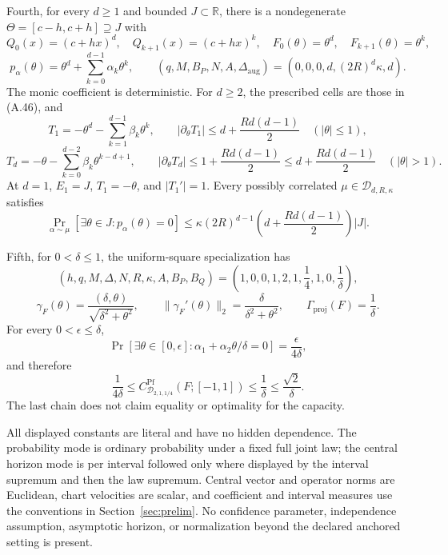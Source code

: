 \begin{proposition}
Fourth, for every $d\geq1$ and bounded $J\subset\mathbb R$, there is a
nondegenerate $\Theta=[c-h,c+h]\supseteq J$ with
\[
Q_0(x)=(c+hx)^d,
\quad Q_{k+1}(x)=(c+hx)^k,
\quad F_0(\theta)=\theta^d,
\quad F_{k+1}(\theta)=\theta^k,
\]
\[
p_\alpha(\theta)=\theta^d+\sum_{k=0}^{d-1}\alpha_k\theta^k,
\qquad
(q,M,B_P,N,A,\Delta_{\mathrm{aug}})
=(0,0,0,d,(2R)^d\kappa,d).
\tag{A.83}
\]
The monic coefficient is deterministic.  For $d\geq2$, the prescribed cells
are those in (A.46), and
\[
T_1=-\theta^d-\sum_{k=1}^{d-1}\beta_k\theta^k,
\qquad
|\partial_\theta T_1|
\leq d+\frac{Rd(d-1)}2
\quad(|\theta|\leq1),
\tag{A.84}
\]
\[
T_d=-\theta-\sum_{k=0}^{d-2}\beta_k\theta^{k-d+1},
\qquad
|\partial_\theta T_d|
\leq1+\frac{Rd(d-1)}2
\leq d+\frac{Rd(d-1)}2
\quad(|\theta|>1).
\tag{A.85}
\]
At $d=1$, $E_1=J$, $T_1=-\theta$, and $|T_1'|=1$.  Every possibly
correlated $\mu\in\mathcal D_{d,R,\kappa}$ satisfies
\[
\Pr_{\alpha\sim\mu}
[\exists\theta\in J:p_\alpha(\theta)=0]
\leq\kappa(2R)^{d-1}
\left(d+\frac{Rd(d-1)}2\right)|J|.
\tag{A.86}
\]

Fifth, for $0<\delta\leq1$, the uniform-square specialization has
\[
(h,q,M,\Delta,N,R,\kappa,A,B_P,B_Q)
=\left(1,0,0,1,2,1,\frac14,1,0,\frac1\delta\right),
\]
\[
\gamma_F(\theta)
=\frac{(\delta,\theta)}{\sqrt{\delta^2+\theta^2}},
\qquad
\|\gamma_F'(\theta)\|_2
=\frac{\delta}{\delta^2+\theta^2},
\qquad
\Gamma_{\mathrm{proj}}(F)=\frac1\delta.
\tag{A.87}
\]
For every $0<\epsilon\leq\delta$,
\[
\Pr[\exists\theta\in[0,\epsilon]:
 \alpha_1+\alpha_2\theta/\delta=0]
=\frac{\epsilon}{4\delta},
\tag{A.88}
\]
and therefore
\[
\frac1{4\delta}
\leq C^{\mathrm{Pf}}_{\mathcal D_{2,1,1/4}}(F;[-1,1])
\leq\frac1\delta
\leq\frac{\sqrt2}{\delta}.
\tag{A.89}
\]
The last chain does not claim equality or optimality for the capacity.

All displayed constants are literal and have no hidden dependence.  The
probability mode is ordinary probability under a fixed full joint law; the
central horizon mode is per interval followed only where displayed by the
interval supremum and then the law supremum.  Central vector and operator
norms are Euclidean, chart velocities are scalar, and coefficient and
interval measures use the conventions in Section~\ref{sec:prelim}.  No confidence
parameter, independence assumption, asymptotic horizon, or normalization
beyond the declared anchored setting is present.
\end{proposition}

